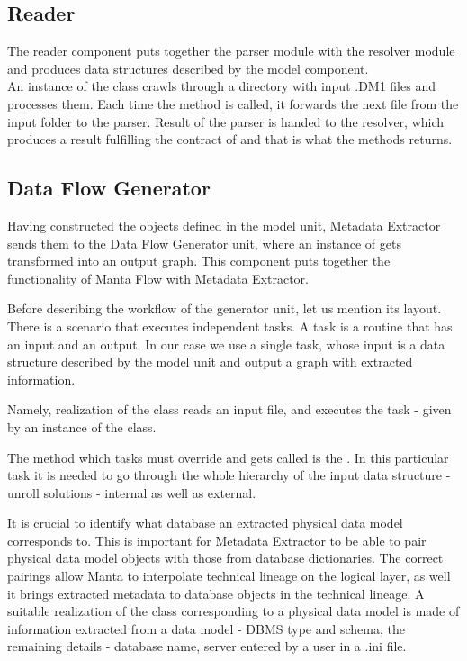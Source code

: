 \subsection{Reader}

The reader component puts together the parser module with the resolver module and produces data structures described by the model component. \\

An instance of the  class crawls through a directory with input .DM1 files and processes them. 
Each time the  method is called, it forwards the next file from the input folder to the parser. Result of the parser is handed to the resolver, which produces a result fulfilling the contract of  and that is what the  methods returns.

\subsection{Data Flow Generator}

Having constructed the objects defined in the model unit, Metadata Extractor sends them to the Data Flow Generator unit, where an instance of  gets transformed into an output graph. This component puts together the functionality of Manta Flow with Metadata Extractor.

Before describing the workflow of the generator unit, let us mention its layout.
There is a scenario that executes independent tasks. A task is a routine that has an input and an output. In our case we use a single task, whose input is a data structure described by the model unit and output a graph with extracted information.

Namely, realization of the class  reads an input file, and executes the task - given by an instance of the  class. 

The method which tasks must override and gets called is the . In this particular task it is needed to go through the whole hierarchy of the input data structure -  unroll solutions - internal as well as external.

It is crucial to identify what database an extracted physical data model corresponds to.
This is important for Metadata Extractor to be able to pair physical data model objects with those from database dictionaries. The correct pairings allow Manta to interpolate technical lineage on the logical layer, as well it brings extracted metadata to database objects in the technical lineage.
A suitable realization of the  class corresponding to a physical data model is made of information extracted from a data model - DBMS type and schema, the remaining details - database name, server entered by a user in a .ini file.

